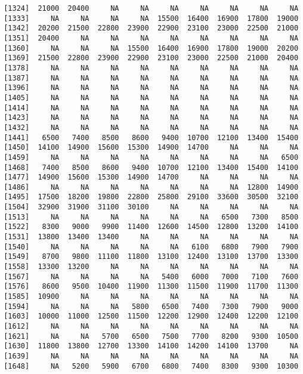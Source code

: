 \documentclass[]{article}
\begin{document}
\begin{verbatim}
 [1324]  21000  20400     NA     NA     NA     NA     NA     NA     NA
 [1333]     NA     NA     NA     NA  15500  16400  16900  17800  19000
 [1342]  20200  21500  22800  23900  22900  23100  23000  22500  21000
 [1351]  20400     NA     NA     NA     NA     NA     NA     NA     NA
 [1360]     NA     NA     NA  15500  16400  16900  17800  19000  20200
 [1369]  21500  22800  23900  22900  23100  23000  22500  21000  20400
 [1378]     NA     NA     NA     NA     NA     NA     NA     NA     NA
 [1387]     NA     NA     NA     NA     NA     NA     NA     NA     NA
 [1396]     NA     NA     NA     NA     NA     NA     NA     NA     NA
 [1405]     NA     NA     NA     NA     NA     NA     NA     NA     NA
 [1414]     NA     NA     NA     NA     NA     NA     NA     NA     NA
 [1423]     NA     NA     NA     NA     NA     NA     NA     NA     NA
 [1432]     NA     NA     NA     NA     NA     NA     NA     NA     NA
 [1441]   6500   7400   8500   8600   9400  10700  12100  13400  15400
 [1450]  14100  14900  15600  15300  14900  14700     NA     NA     NA
 [1459]     NA     NA     NA     NA     NA     NA     NA     NA   6500
 [1468]   7400   8500   8600   9400  10700  12100  13400  15400  14100
 [1477]  14900  15600  15300  14900  14700     NA     NA     NA     NA
 [1486]     NA     NA     NA     NA     NA     NA     NA  12800  14900
 [1495]  17500  18200  19800  22800  25800  29100  33600  30500  32100
 [1504]  32900  31900  31100  30100     NA     NA     NA     NA     NA
 [1513]     NA     NA     NA     NA     NA     NA   6500   7300   8500
 [1522]   8300   9000   9900  11400  12600  14500  12800  13200  14100
 [1531]  13800  13400  13400     NA     NA     NA     NA     NA     NA
 [1540]     NA     NA     NA     NA     NA   6100   6800   7900   7900
 [1549]   8700   9800  11100  11800  13100  12400  13100  13700  13300
 [1558]  13300  13200     NA     NA     NA     NA     NA     NA     NA
 [1567]     NA     NA     NA     NA   5400   6000   7000   7100   7600
 [1576]   8600   9500  10400  11900  11300  11500  11900  11700  11300
 [1585]  10900     NA     NA     NA     NA     NA     NA     NA     NA
 [1594]     NA     NA     NA   5800   6500   7400   7300   7900   9000
 [1603]  10000  11000  12500  11500  12200  12900  12400  12200  12100
 [1612]     NA     NA     NA     NA     NA     NA     NA     NA     NA
 [1621]     NA     NA   5700   6500   7500   7700   8200   9300  10500
 [1630]  11800  13800  12700  13300  14100  14200  14100  13700     NA
 [1639]     NA     NA     NA     NA     NA     NA     NA     NA     NA
 [1648]     NA   5200   5900   6700   6800   7400   8300   9300  10300

\end{verbatim}
\end{document}

